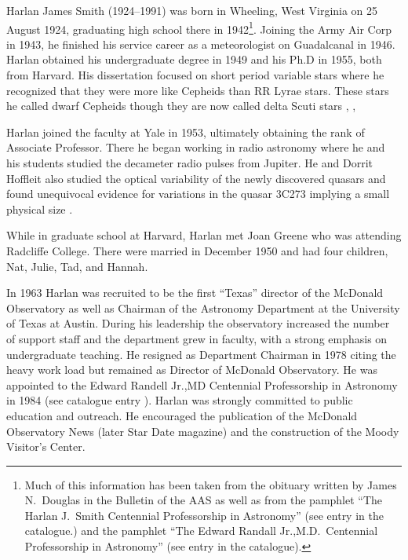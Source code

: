 
Harlan James Smith (1924--1991) was born in Wheeling, West Virginia on
25 August 1924, graduating high school there in 1942\footnote{Much of
this information has been taken from the obituary written by James
N.~Douglas in the Bulletin of the AAS \cite{Douglas1992Harlan} as
well as from the pamphlet ``The Harlan J.~Smith Centennial
Professorship in Astronomy'' (see entry  in the catalogue.)
and the pamphlet ``The Edward Randall Jr.,M.D.~Centennial
Professorship in Astronomy'' (see entry  in the
catalogue).}. Joining the Army Air Corp in 1943, he finished his
service career as a meteorologist on Guadalcanal in 1946.  Harlan
obtained his undergraduate degree in 1949 and his Ph.D in 1955, both
from Harvard. His dissertation focused on short period variable stars
where he recognized that they were more like Cepheids than RR Lyrae
stars.  These stars he called dwarf Cepheids though they are now
called delta Scuti stars \cite{HJS1955}, \cite{HJSPhD},

Harlan joined the faculty at Yale in 1953, ultimately obtaining the rank of
Associate Professor. There he began working in radio astronomy where
he and his students studied the decameter radio pulses from
Jupiter. He and Dorrit Hoffleit also studied the optical variability of
the newly discovered quasars and found unequivocal evidence for
variations in the quasar 3C273 implying a small physical size
\cite{HJS1963}.

While in graduate school at Harvard, Harlan met Joan Greene
who was attending Radcliffe College. There were married in December
1950 and had four children, Nat, Julie, Tad, and Hannah.

In 1963 Harlan was recruited to be the first ``Texas'' director of the
McDonald Observatory as well as Chairman of the Astronomy Department
at the University of Texas at Austin. During his leadership the
observatory increased the number of support staff and the department
grew in faculty, with a strong emphasis on undergraduate teaching. He
resigned as Department Chairman in 1978 citing the heavy work load but
remained as Director of McDonald Observatory. He was appointed to the
Edward Randell Jr.,MD Centennial Professorship in Astronomy in 1984
(see catalogue entry ).  Harlan was strongly committed to
public education and outreach.  He encouraged the publication of the
McDonald Observatory News (later Star Date magazine) and the
construction of the Moody Visitor's Center.

